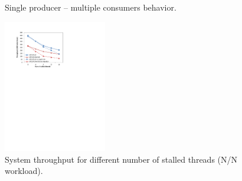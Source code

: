 \begin{figure}[htb]
	\centering
	\caption{\footnotesize{Single producer -- multiple consumers behavior. }}
	\label{fig:1-n-salsa}
\end{figure}

\begin{figure}[htb]
	\centering
	\includegraphics[width=0.40\textwidth]{figures/stalled-threads}
  \caption{\footnotesize{System throughput for different number of stalled threads (N/N workload). }}
	\label{fig:stalled-threads}
\end{figure}

